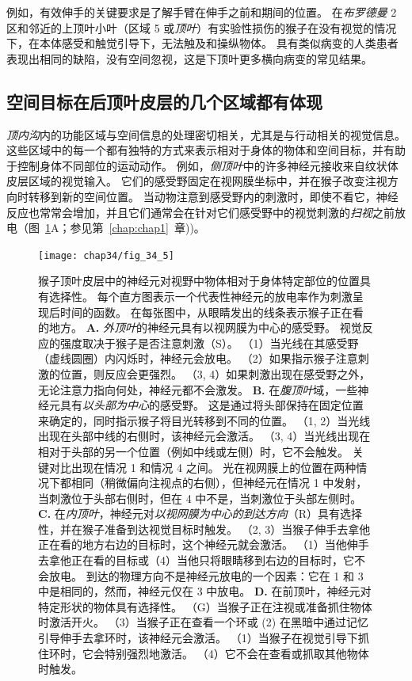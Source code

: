 例如，有效伸手的关键要求是了解手臂在伸手之前和期间的位置。
在\textit{布罗德曼} 2 区和邻近的上顶叶小叶（区域 5 或\textit{顶叶}）有实验性损伤的猴子在没有视觉的情况下，在本体感受和触觉引导下，无法触及和操纵物体。
具有类似病变的人类患者表现出相同的缺陷，没有空间忽视，这是下顶叶更多横向病变的常见结果。



\subsection{空间目标在后顶叶皮层的几个区域都有体现}

\textit{顶内沟}内的功能区域与空间信息的处理密切相关，尤其是与行动相关的视觉信息。
这些区域中的每一个都有独特的方式来表示相对于身体的物体和空间目标，并有助于控制身体不同部位的运动动作。
例如，\textit{侧顶叶}中的许多神经元接收来自纹状体皮层区域的视觉输入。
它们的感受野固定在视网膜坐标中，并在猴子改变注视方向时转移到新的空间位置。
当动物注意到感受野内的刺激时，即使不看它，神经反应也常常会增加，并且它们通常会在针对它们感受野中的视觉刺激的\textit{扫视}之前放电（图~\ref{fig:34_5}A；参见第~\ref{chap:chap1}~章))。


\begin{figure}[htbp]
	\centering
	\texttt{[image: chap34/fig\_34\_5]}
	\caption{猴子顶叶皮层中的神经元对视野中物体相对于身体特定部位的位置具有选择性。
		每个直方图表示一个代表性神经元的放电率作为刺激呈现后时间的函数。
		在每张图中，从眼睛发出的线条表示猴子正在看的地方。
		\textbf{A.} \textit{外顶叶}的神经元具有以视网膜为中心的感受野。
		视觉反应的强度取决于猴子是否注意刺激（S）。
		（1）当光线在其感受野（虚线圆圈）内闪烁时，神经元会放电。
		（2）如果指示猴子注意刺激的位置，则反应会更强烈。 
		（3, 4）如果刺激出现在感受野之外，无论注意力指向何处，神经元都不会激发。
		\textbf{B.} 在\textit{腹顶叶}域，一些神经元具有\textit{以头部为中心}的感受野。
		这是通过将头部保持在固定位置来确定的，同时指示猴子将目光转移到不同的位置。
		（1, 2）当光线出现在头部中线的右侧时，该神经元会激活。
		（3, 4）当光线出现在相对于头部的另一个位置（例如中线或左侧）时，它不会触发。
		 关键对比出现在情况 1 和情况 4 之间。
		 光在视网膜上的位置在两种情况下都相同（稍微偏向注视点的右侧），但神经元在情况 1 中发射，当刺激位于头部右侧时，但在 4 中不是，当刺激位于头部左侧时。 
		 \textbf{C.} 在\textit{内顶叶}，神经元对\textit{以视网膜为中心的到达方向}（R）具有选择性，并在猴子准备到达视觉目标时触发。
		 （2, 3）当猴子伸手去拿他正在看的地方右边的目标时，这个神经元就会激活。
		 （1）当他伸手去拿他正在看的目标或（4）当他只将眼睛移到右边的目标时，它不会放电。
		 到达的物理方向不是神经元放电的一个因素：它在 1 和 3 中是相同的，然而，神经元仅在 3 中放电。
		 \textbf{D.} 在前顶叶，神经元对特定形状的物体具有选择性。
		 （G）当猴子正在注视或准备抓住物体时激活开火。
		 （3）当猴子正在查看一个环或 (2) 在黑暗中通过记忆引导伸手去拿环时，该神经元会激活。
		 （1）当猴子在视觉引导下抓住环时，它会特别强烈地激活。
		 （4）它不会在查看或抓取其他物体时触发。}
	\label{fig:34_5}
\end{figure}


